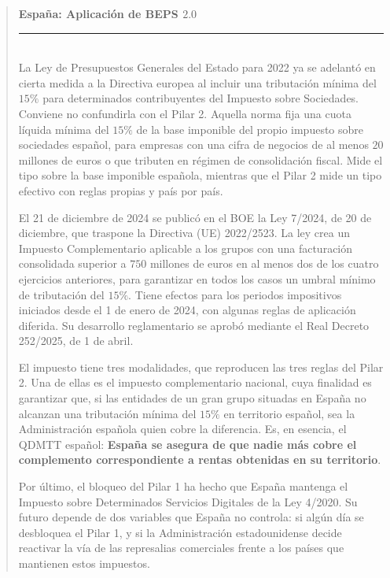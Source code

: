 \documentclass[10pt,a4paper]{article}
\newenvironment{specialblock}[1]{%
      \begin{quote} %
      \small %
      \noindent\textbf{#1}\\[-0.3em] %
      \rule{\linewidth}{0.4pt}\\[0.6em]}{
      \end{quote}}
\begin{document}
\begin{specialblock}{\textbf{España}: Aplicación de BEPS $2.0$}
    La Ley de Presupuestos Generales del Estado para 2022 ya se adelantó en cierta medida a la Directiva europea al incluir una tributación mínima del $15\%$ para determinados contribuyentes del Impuesto sobre Sociedades. Conviene no confundirla con el Pilar 2. Aquella norma fija una cuota líquida mínima del $15\%$ de la base imponible del propio impuesto sobre sociedades español, para empresas con una cifra de negocios de al menos $20$ millones de euros o que tributen en régimen de consolidación fiscal. Mide el tipo sobre la base imponible española, mientras que el Pilar 2 mide un tipo efectivo con reglas propias y país por país.

    El 21 de diciembre de 2024 se publicó en el BOE la Ley 7/2024, de 20 de diciembre, que traspone la Directiva (UE) 2022/2523. La ley crea un Impuesto Complementario aplicable a los grupos con una facturación consolidada superior a $750$ millones de euros en al menos dos de los cuatro ejercicios anteriores, para garantizar en todos los casos un umbral mínimo de tributación del $15\%$. Tiene efectos para los periodos impositivos iniciados desde el 1 de enero de 2024, con algunas reglas de aplicación diferida. Su desarrollo reglamentario se aprobó mediante el Real Decreto 252/2025, de 1 de abril.
    
    El impuesto tiene tres modalidades, que reproducen las tres reglas del Pilar 2. Una de ellas es el impuesto complementario nacional, cuya finalidad es garantizar que, si las entidades de un gran grupo situadas en España no alcanzan una tributación mínima del $15\%$ en territorio español, sea la Administración española quien cobre la diferencia. Es, en esencia, el QDMTT español: \textbf{España se asegura de que nadie más cobre el complemento correspondiente a rentas obtenidas en su territorio}.
    
    Por último, el bloqueo del Pilar 1 ha hecho que España mantenga el Impuesto sobre Determinados Servicios Digitales de la Ley 4/2020. Su futuro depende de dos variables que España no controla: si algún día se desbloquea el Pilar 1, y si la Administración estadounidense decide reactivar la vía de las represalias comerciales frente a los países que mantienen estos impuestos.
\end{specialblock}
\end{document}
